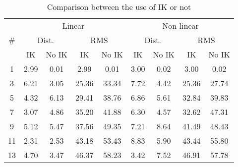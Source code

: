 \begin{table}[]
\scriptsize
  \caption{Comparison between the use of IK or not}
  \centering
  \begin{tabular}{ccccc|cccc}
  \hline
  & \multicolumn{4}{c}{Linear} & \multicolumn{4}{c}{Non-linear}\\
  \multicolumn{1}{c}{\#} & \multicolumn{2}{c}{Dist.} & \multicolumn{2}{c}{RMS} & \multicolumn{2}{c}{Dist.} & \multicolumn{2}{c}{RMS}\\
  \multicolumn{1}{l}{}  & IK & No IK & IK & No IK & IK & No IK & IK & No IK \\ \hline
  1   & 2.99 & 0.01 & 2.99 & 0.01 & 3.00 & 0.02 & 3.00 & 0.02  \\
  3   & 6.21 & 3.05 & 25.36 & 33.34 & 7.72 & 4.42 & 25.36 & 27.74 \\
  5   & 4.32 & 6.13 & 29.41 & 38.76 & 6.86 & 5.61 & 32.84 & 39.83 \\
  7   & 3.07 & 4.86 & 35.20 & 41.88 & 6.30 & 4.57 & 32.62 & 47.31 \\
  9   & 5.12 & 5.47 & 37.56 & 49.35 & 7.21 & 8.64 & 41.49 & 48.43 \\
  11  & 2.31 & 2.53 & 43.18 & 53.43 & 8.83 & 5.90 & 43.44 & 55.80 \\
  13  & 4.70 & 3.47 & 46.37 & 58.23 & 3.42 & 7.52 & 46.91 & 57.78 \\
  \hline
  \end{tabular}
  \label{tab:IK_comparison}
\end{table}

